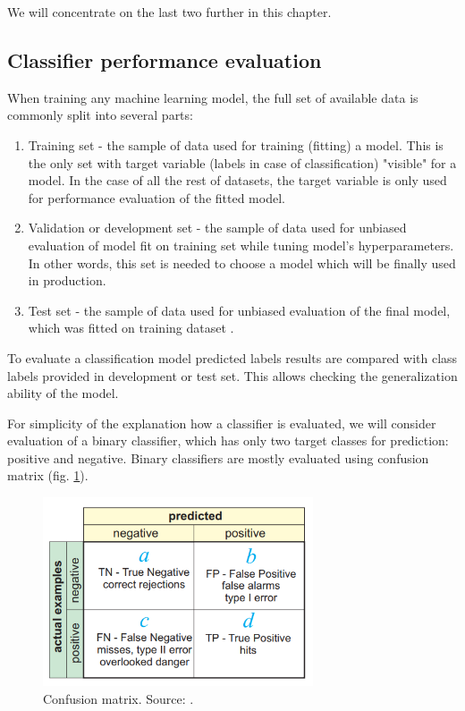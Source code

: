 We will concentrate on the last two further in this chapter.

\subsection{Classifier performance evaluation}

When training any machine learning model, the full set of available data is commonly split into several parts:
\begin{enumerate}
    \item Training set - the sample of data used for training (fitting) a model. This is the only set with target variable (labels in case of classification) "visible" for a model. In the case of all the rest of datasets, the target variable is only used for performance evaluation of the fitted model. 
    \item Validation or development set - the sample of data used for unbiased evaluation of model fit on training set while tuning model's hyperparameters. In other words, this set is needed to choose a model which will be finally used in production.
    \item Test set - the sample of data used for unbiased evaluation of the final model, which was fitted on training dataset \citep{Kuhn-2013}.
\end{enumerate}

To evaluate a classification model predicted labels results are compared with class labels provided in development or test set. This allows checking the generalization ability of the model.

For simplicity of the explanation how a classifier is evaluated, we will consider evaluation of a binary classifier, which has only two target classes for prediction: positive and negative. 
Binary classifiers are mostly evaluated using confusion matrix (fig. \ref{fig:confusion-matrix}).

\begin{figure}[h]
    \centering
    \includegraphics[width=8cm]{Images/Confusion-matrix.png}
    \caption{Confusion matrix. Source: \citep{kohavi:glossary}.}
    \label{fig:confusion-matrix}
\end{figure}

